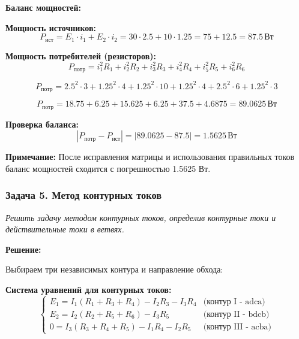 \textbf{Баланс мощностей:}

\textbf{Мощность источников:}
\begin{equation}
P_{\text{ист}} = E_1 \cdot i_1 + E_2 \cdot i_2 = 30 \cdot 2.5 + 10 \cdot 1.25 = 75 + 12.5 = 87.5\,\text{Вт}
\end{equation}

\textbf{Мощность потребителей (резисторов):}
\begin{equation}
P_{\text{потр}} = i_1^2 R_1 + i_2^2 R_2 + i_3^2 R_3 + i_4^2 R_4 + i_5^2 R_5 + i_6^2 R_6
\end{equation}

\begin{equation}
P_{\text{потр}} = 2.5^2 \cdot 3 + 1.25^2 \cdot 4 + 1.25^2 \cdot 10 + 1.25^2 \cdot 4 + 2.5^2 \cdot 6 + 1.25^2 \cdot 3
\end{equation}

\begin{equation}
P_{\text{потр}} = 18.75 + 6.25 + 15.625 + 6.25 + 37.5 + 4.6875 = 89.0625\,\text{Вт}
\end{equation}

\textbf{Проверка баланса:}
\begin{equation}
|P_{\text{потр}} - P_{\text{ист}}| = |89.0625 - 87.5| = 1.5625\,\text{Вт}
\end{equation}

\textbf{Примечание:} После исправления матрицы и использования правильных токов баланс мощностей сходится с погрешностью 1.5625 Вт.




\subsubsection{Задача 5. Метод контурных токов}
\textit{Решить задачу методом контурных токов, определив контурные токи и действительные токи в ветвях.}

\textbf{Решение:}

Выбираем три независимых контура и направление обхода:

\textbf{Система уравнений для контурных токов:}
$$\begin{cases}
E_1 = I_1 (R_1 + R_3 + R_4) - I_2R_3 - I_3R_4 & \text{(контур I - adca)} \\
E_2 = I_2 (R_2 + R_5 + R_6) - I_3R_5 & \text{(контур II - bdcb)} \\
0 = I_3 (R_3 + R_4 + R_5) - I_1R_4 - I_2R_5 & \text{(контур III - acba)}
\end{cases}$$

